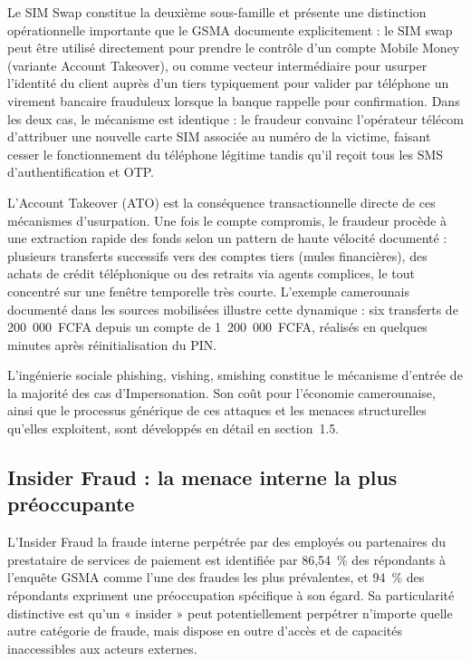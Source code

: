 \documentclass[11pt,a4paper,oneside]{report}
\theoremstyle{definition}
\theoremstyle{remark}
\begin{document}
Le SIM Swap constitue la deuxième sous-famille et présente une distinction opérationnelle importante que le GSMA documente explicitement : le SIM swap peut être utilisé directement pour prendre le contrôle d'un compte Mobile Money (variante Account Takeover), ou comme vecteur intermédiaire pour usurper l'identité du client auprès d'un tiers  typiquement pour valider par téléphone un virement bancaire frauduleux lorsque la banque rappelle pour confirmation. Dans les deux cas, le mécanisme est identique : le fraudeur convainc l'opérateur télécom d'attribuer une nouvelle carte SIM associée au numéro de la victime, faisant cesser le fonctionnement du téléphone légitime tandis qu'il reçoit tous les SMS d'authentification et OTP.

L'Account Takeover (ATO) est la conséquence transactionnelle directe de ces mécanismes d'usurpation. Une fois le compte compromis, le fraudeur procède à une extraction rapide des fonds selon un pattern de haute vélocité documenté : plusieurs transferts successifs vers des comptes tiers (mules financières), des achats de crédit téléphonique ou des retraits via agents complices, le tout concentré sur une fenêtre temporelle très courte. L'exemple camerounais documenté dans les sources mobilisées illustre cette dynamique : six transferts de 200~000~FCFA depuis un compte de 1~200~000~FCFA, réalisés en quelques minutes après réinitialisation du PIN.

L'ingénierie sociale  phishing, vishing, smishing  constitue le mécanisme d'entrée de la majorité des cas d'Impersonation. Son coût pour l'économie camerounaise, ainsi que le processus générique de ces attaques et les menaces structurelles qu'elles exploitent, sont développés en détail en section~1.5.

\subsection{Insider Fraud : la menace interne la plus préoccupante}

L'Insider Fraud  la fraude interne perpétrée par des employés ou partenaires du prestataire de services de paiement  est identifiée par 86,54~\% des répondants à l'enquête GSMA comme l'une des fraudes les plus prévalentes, et 94~\% des répondants expriment une préoccupation spécifique à son égard. Sa particularité distinctive est qu'un « insider » peut potentiellement perpétrer n'importe quelle autre catégorie de fraude, mais dispose en outre d'accès et de capacités inaccessibles aux acteurs externes.
\end{document}

